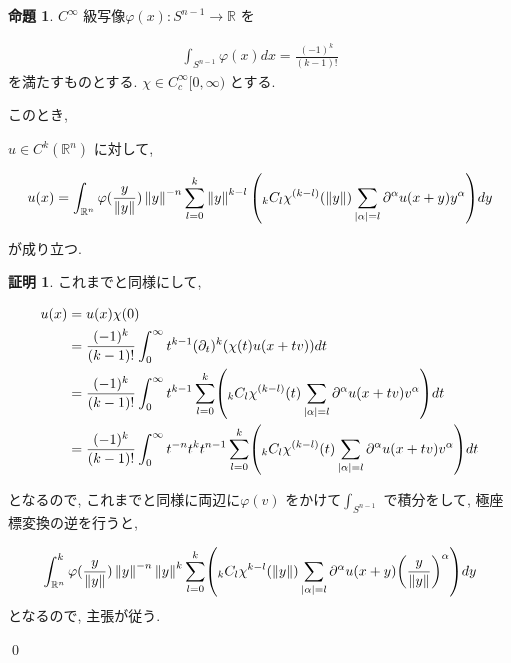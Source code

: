 \documentclass[10pt, fleqn, label-section=none]{bxjsarticle}
\theoremstyle{definition}
\newtheorem{prop}[dfn]{命題}
\newtheorem*{pf*}{証明}
\newcommand{\paren}[1]{\mleft( #1\mright )}
\newcommand{\abs}[1]{\left|#1\right|}
\newcommand{\norm}[1]{\left\|#1\right\|}
\renewcommand{\;}{\, ; \,}
\newcommand{\C}[2]{{}_{#1}C_{#2} }
\begin{document}
\begin{prop}$C^\infty$ 級写像$\varphi(x): S^{n-1} \rightarrow \mathbb R$ を

\begin{align*} \int_{S^{n-1}} \varphi (x) dx = \frac{(-1)^k}{(k-1)!}   \end{align*} 
を満たすものとする. $\chi \in C_c^\infty[0, \infty)$ とする. 

このとき, 

$u \in C^k (\mathbb R^n) $ に対して, 

\begin{align*} u(x) = \int_{\mathbb R^n} \varphi(\frac{y}{\norm y}) \norm{y}^{-n} \sum_{l = 0}^k  \norm{y}^{k-l} \paren{ \C{k}{l} \chi^{(k-l)}(\norm y) \sum_{\abs \alpha = l} \partial^\alpha u(x+ y) {y}^\alpha }dy        \end{align*}

が成り立つ. 

\end{prop}
\begin{pf*} これまでと同様にして, 

\begin{align*}
u(x) &= u(x)\chi(0) 
\\&= \frac{(-1)^k}{(k-1)!} \int_0^\infty t^{k-1} (\partial_t ) ^k (\chi(t)u (x + tv)) dt 
\\&=  \frac{(-1)^k}{(k-1)!} \int_0^\infty t^{k-1} \sum_{l=0}^k \paren{\C{k}{l} \chi^{(k-l)} (t) \sum_{\abs \alpha = l} \partial^\alpha u(x + tv)v ^\alpha } dt
\\&=   \frac{(-1)^k}{(k-1)!} \int_0^\infty t^{-n} t^{k}t^{n-1} \sum_{l=0}^k \paren{\C{k}{l} \chi^{(k-l)}(t) \sum_{\abs \alpha = l} \partial^\alpha u(x + tv)v ^\alpha } dt
 \end{align*}

となるので, これまでと同様に両辺に$\varphi(v)$ をかけて$\int_{S^{n-1}}$ で積分をして,  極座標変換の逆を行うと, 

\begin{align*}
 \int_{\mathbb R^n} ^{k} \varphi(\frac{y}{\norm y}) \norm y^{-n} \norm y^{k}  \sum_{l=0}^k \paren{\C{k}{l} \chi^{k-l} (\norm y) \sum_{\abs \alpha = l} \partial^\alpha u(x + y) \paren{\frac{y}{\norm y}} ^\alpha } dy
 \end{align*}
 となるので, 主張が従う. 

\qed
\end{pf*}
\end{document}

